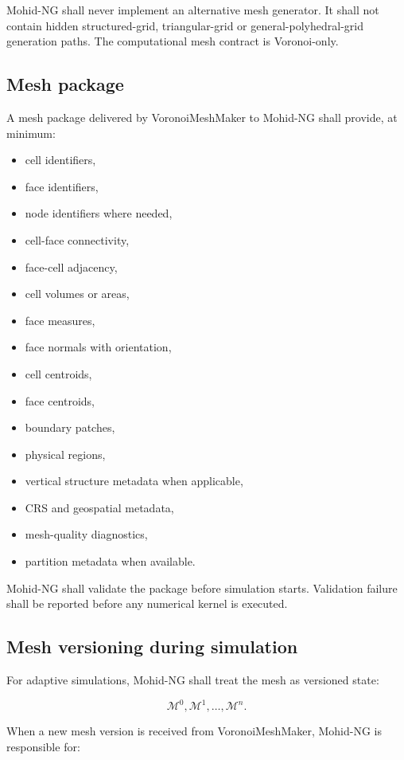 \documentclass[11pt,a4paper]{article}
\begin{document}
Mohid-NG shall never implement an alternative mesh generator. It shall not contain hidden structured-grid, triangular-grid or general-polyhedral-grid generation paths. The computational mesh contract is Voronoi-only.

\subsection{Mesh package}

A mesh package delivered by VoronoiMeshMaker to Mohid-NG shall provide, at minimum:

\begin{itemize}
  \item cell identifiers,
  \item face identifiers,
  \item node identifiers where needed,
  \item cell-face connectivity,
  \item face-cell adjacency,
  \item cell volumes or areas,
  \item face measures,
  \item face normals with orientation,
  \item cell centroids,
  \item face centroids,
  \item boundary patches,
  \item physical regions,
  \item vertical structure metadata when applicable,
  \item CRS and geospatial metadata,
  \item mesh-quality diagnostics,
  \item partition metadata when available.
\end{itemize}

Mohid-NG shall validate the package before simulation starts. Validation failure shall be reported before any numerical kernel is executed.

\subsection{Mesh versioning during simulation}

For adaptive simulations, Mohid-NG shall treat the mesh as versioned state:

\[
\mathcal{M}^{0}, \mathcal{M}^{1}, \ldots, \mathcal{M}^{n}.
\]

When a new mesh version is received from VoronoiMeshMaker, Mohid-NG is responsible for:
\end{document}

